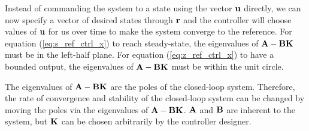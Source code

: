 Instead of commanding the \gls{system} to a \gls{state} using the vector
$\mathbf{u}$ directly, we can now specify a vector of desired \glspl{state} through
$\mathbf{r}$ and the \gls{controller} will choose values of $\mathbf{u}$ for us over
time to make the \gls{system} converge to the \gls{reference}. For equation
(\ref{eq:s_ref_ctrl_x}) to reach steady-state, the eigenvalues of
$\mathbf{A} - \mathbf{B}\mathbf{K}$ must be in the left-half plane. For equation
(\ref{eq:z_ref_ctrl_x}) to have a bounded output, the eigenvalues of
$\mathbf{A} - \mathbf{B}\mathbf{K}$ must be within the unit circle.

The eigenvalues of $\mathbf{A} - \mathbf{B}\mathbf{K}$ are the poles of the closed-loop
\gls{system}. Therefore, the rate of convergence and stability of the
closed-loop \gls{system} can be changed by moving the poles via the eigenvalues
of $\mathbf{A} - \mathbf{B}\mathbf{K}$. $\mathbf{A}$ and $\mathbf{B}$ are inherent to the
\gls{system}, but $\mathbf{K}$ can be chosen arbitrarily by the controller
designer.
